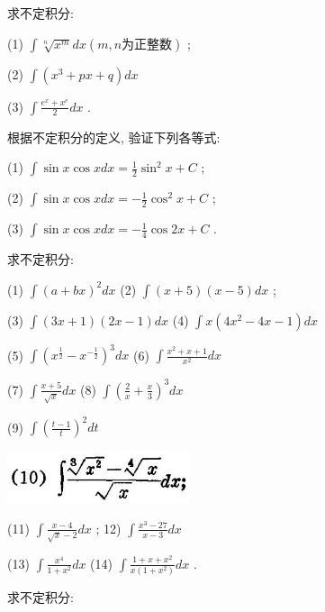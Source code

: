 \documentclass[lang=cn,newtx,10pt,scheme=chinese]{elegantbook}
\begin{document}
\begin{problemset}[习 题 十 三]

\item 求不定积分:

(1) \(\int \sqrt[n]{{x}^{m}}{dx}\left( {m,n\text{为正整数}}\right)\) ;

(2) \(\int \left( {{x}^{3} + {px} + q}\right) {dx}\)

(3) \(\int \frac{{e}^{x} + {x}^{e}}{2}{dx}\) .

\item 根据不定积分的定义, 验证下列各等式:

(1) \(\int \sin x\cos {xdx} = \frac{1}{2}{\sin }^{2}x + C\) ;

(2) \(\int \sin x\cos {xdx} = - \frac{1}{2}{\cos }^{2}x + C\) ;

(3) \(\int \sin x\cos {xdx} = - \frac{1}{4}\cos {2x} + C\) .

\item 求不定积分:

(1) \(\int {\left( a + bx\right) }^{2}{dx}\) (2) \(\int \left( {x + 5}\right) \left( {x - 5}\right) {dx}\) ;

(3) \(\int \left( {{3x} + 1}\right) \left( {{2x} - 1}\right) {dx}\) (4) \(\int x\left( {4{x}^{2} - {4x} - 1}\right) {dx}\)

(5) \(\int {\left( {x}^{\frac{1}{2}} - {x}^{-\frac{1}{2}}\right) }^{3}{dx}\) (6) \(\int \frac{{x}^{2} + x + 1}{{x}^{2}}{dx}\)

(7) \(\int \frac{x + 5}{\sqrt{x}}{dx}\) (8) \(\int {\left( \frac{2}{x} + \frac{x}{3}\right) }^{3}{dx}\)

(9) \(\int {\left( \frac{t - 1}{t}\right) }^{2}{dt}\)

\begin{center}
\includegraphics[max width=0.4\textwidth]{images/01912c18-5c3f-733d-b775-749ba9897a9d_197_590705.jpg}
\end{center}

(11) \(\int \frac{x - 4}{\sqrt{x} - 2}{dx}\) ; 12) \(\int \frac{{x}^{3} - {27}}{x - 3}{dx}\)

(13) \(\int \frac{{x}^{4}}{1 + {x}^{2}}{dx}\) (14) \(\int \frac{1 + x + {x}^{2}}{x\left( {1 + {x}^{2}}\right) }{dx}\) .

\item 求不定积分:


\end{problemset}
\end{document}
